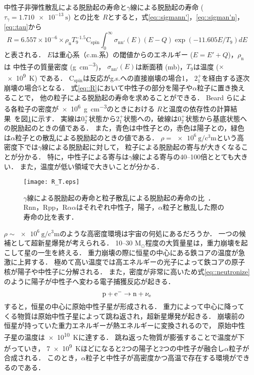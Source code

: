 \documentclass[../master]{subfiles}
\begin{document}
中性子非弾性散乱による脱励起の寿命と$\gamma$線による脱励起の寿命 ($\tau_{\gamma} = \SI{1.710e-13}{\second}$) との比を
$R$とすると，式\eqref{eq::sigmann'}，\eqref{eq::sigman'n}，\eqref{eq::tau}から
\begin{equation}
  R = 6.557\times10^{-6}\times\rho_{\mathrm{n}}T_{9}^{-1.5}\mathrm{C}_{{\text{spin}}}
  \int^{\infty}_{0}\sigma_{\mathrm{nn}'}(E)(E-Q)\exp(-11.605E/T_{9})dE
  \label{eq::R}
\end{equation}
と表される．
$E$は重心系（c.m.系）の閾値からのエネルギー ($E=E'+Q$)，$\rho_{\mathrm{n}}$は
中性子の質量密度 (\si{\gram\per\cubic\centi\metre})，
$\sigma_{\mathrm{nn}'}(E)$は断面積 (\si{\milli\barn})，$T_{9}$は温度 ($\times$\SI{e9}{\kelvin}) である．
$\mathrm{C}_{{\text{spin}}}$は反応がg.s.への直接崩壊の場合1，
$2_{1}^{+}$を経由する逐次崩壊の場合5となる．
式\eqref{eq::R}において中性子の部分を陽子や$\alpha$粒子に置き換えることで，
他の粒子による脱励起の寿命を求めることができる．
Beard らによる各粒子の密度が\SI{e6}{\gram\per\cubic\centi\metre}のときにおける
$R$と温度の依存性の計算結果~\cite{hotdensemedium}を図\ref{fig::R}に示す．
実線は$0_2^+$状態から$2_1^+$状態への，破線は$0_2^+$状態から基底状態への脱励起のときの値である．
また，青色は中性子との，赤色は陽子との，緑色は$\alpha$粒子との散乱による脱励起のときの値である．
$\rho = \SI{e6}{\gram\per\cubic\centi\metre}$という高密度下では$\gamma$線による脱励起に対して，
粒子による脱励起の寄与が大きくなることが分かる．
特に，中性子による寄与は$\gamma$線による寄与の40--100倍ととても大きい．
また，温度が低い領域で大きいことが分かる．
\begin{figure}
  \centering
  \texttt{[image: R\_T.eps]}
  \caption[$\gamma$線による脱励起の寿命と粒子散乱による脱励起の寿命の比．]
          {$\gamma$線による脱励起の寿命と粒子散乱による脱励起の寿命の比~\cite{hotdensemedium}．
    Rnn，Rpp，R$\alpha\alpha$はそれぞれ中性子，陽子，$\alpha$粒子と散乱した際の寿命の比を表す．}
  \label{fig::R}
\end{figure}

$\rho\sim\SI{e6}{\gram\per\cubic\centi\metre}$のような高密度環境は宇宙の何処にあるだろうか．
一つの候補として超新星爆発が考えられる．
10--30 $\mathrm{M_{\odot}}$程度の大質量星は，重力崩壊を起こして星の一生を終える．
重力崩壊の際に恒星の中心にある鉄コアの温度が急激に上昇する．
極めて高い温度では高エネルギーの光子によって鉄コアの原子核が陽子や中性子に分解される．
また，密度が非常に高いため式\eqref{eq::neutronize}のように陽子が中性子へ変わる電子捕獲反応が起きる．
\begin{equation}
  {\rm p}+{\rm e}^{-} \rightarrow {\rm n}+\nu_{\rm e}
  \label{eq::neutronize}
\end{equation}
すると，恒星の中心に原始中性子星が形成される．
重力によって中心に降ってくる物質は原始中性子星によって跳ね返され，超新星爆発が起きる．
崩壊前の恒星が持っていた重力エネルギーが熱エネルギーに変換されるので，
原始中性子星の温度は\SI{e10}{\kelvin}に達する．
跳ね返った物質が膨張することで温度が下がっていき，
\SI{7e9}{\kelvin}ほどになると2つの陽子と2つの中性子が融合し$\alpha$粒子が合成される．
このとき，$\alpha$粒子と中性子が高密度かつ高温で存在する環境ができるのである．
\end{document}
